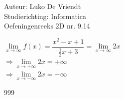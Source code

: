 \documentclass[a4paper]{article}
\begin{document}
\noindent \large Auteur: Luko De Vriendt\\
\noindent \large Studierichting: Informatica\\
\noindent \large Oefeningenreeks 2D nr. 9.14\\

\medskip

\normalsize


$\lim\limits_{x \rightarrow \infty} f(x) = \dfrac{x^2 - x + 1}{\tfrac{1}{2}x + 3} = \lim\limits_{x \rightarrow \infty} 2x$ \\

$\Rightarrow \lim\limits_{x \rightarrow +\infty} 2x = +\infty$ \\

$\Rightarrow \lim\limits_{x \rightarrow -\infty} 2x = -\infty$ \\

\begin{thebibliography}{999}
\end{thebibliography}
\end{document}
